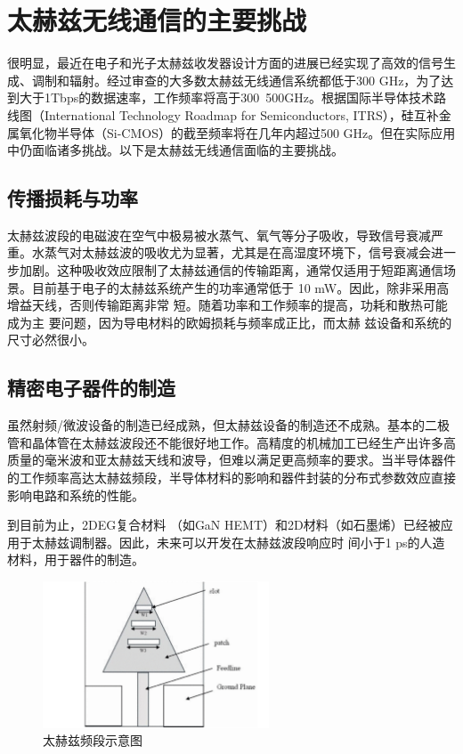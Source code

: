 \section{太赫兹无线通信的主要挑战}
很明显，最近在电子和光子太赫兹收发器设计方面的进展已经实现了高效的信号生成、调制和辐射。经过审查的大多数太赫兹无线通信系统都低于300 GHz，为了达到大于1Tbps的数据速率，工作频率将高于300~500GHz。根据国际半导体技术路线图（International Technology Roadmap for Semiconductors, ITRS），硅互补金属氧化物半导体（Si-CMOS）的截至频率将在几年内超过500 GHz。但在实际应用中仍面临诸多挑战。以下是太赫兹无线通信面临的主要挑战。

\subsection{传播损耗与功率}

太赫兹波段的电磁波在空气中极易被水蒸气、氧气等分子吸收，导致信号衰减严重。水蒸气对太赫兹波的吸收尤为显著，尤其是在高湿度环境下，信号衰减会进一步加剧。这种吸收效应限制了太赫兹通信的传输距离，通常仅适用于短距离通信场景。目前基于电子的太赫兹系统产生的功率通常低于
10 mW。因此，除非采用高增益天线，否则传输距离非常
短。随着功率和工作频率的提高，功耗和散热可能成为主
要问题，因为导电材料的欧姆损耗与频率成正比，而太赫
兹设备和系统的尺寸必然很小。

\subsection{精密电子器件的制造}

虽然射频/微波设备的制造已经成熟，但太赫兹设备的制造还不成熟。基本的二极管和晶体管在太赫兹波段还不能很好地工作。高精度的机械加工已经生产出许多高质量的毫米波和亚太赫兹天线和波导，但难以满足更高频率的要求。当半导体器件的工作频率高达太赫兹频段，半导体材料的影响和器件封装的分布式参数效应直接影响电路和系统的性能。

到目前为止，2DEG复合材料
（如GaN HEMT）和2D材料（如石墨烯）\cite{10698344}已经被应用于太赫兹调制器。因此，未来可以开发在太赫兹波段响应时
间小于1 ps的人造材料，用于器件的制造。

\begin{figure}[htbp]
	\centering
	\includegraphics[width=0.6\textwidth]{img/img5.png} %
	\caption{太赫兹频段示意图}
	\label{fig:example}
\end{figure}

